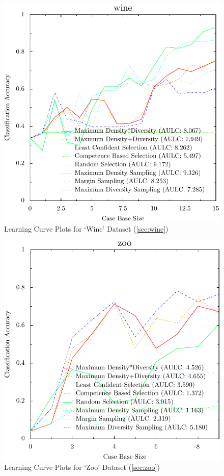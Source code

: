 \documentclass[a4paper,11pt]{report}
\begin{document}
\begin{figure}[h!]
\includegraphics{./Plots/wine}
\caption{Learning Curve Plots for `Wine' Dataset (\ref{sec:wine})}
\end{figure}

\begin{figure}[h!]
\includegraphics{./Plots/zoo}
\caption{Learning Curve Plots for `Zoo' Dataset (\ref{sec:zoo})}
\end{figure}
\end{document}
